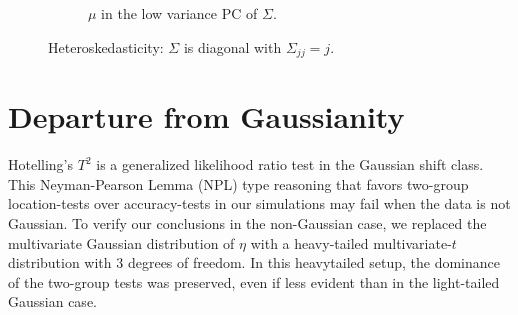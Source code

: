 \documentclass[oupdraft]{bio}
\begin{document}
\begin{figure}[h]
\begin{subfigure}[t]{0.45\columnwidth}
		\caption{$\mu$ in the low variance PC of $\Sigma$.}  
		\label{fig:heteroskedastic_12}	
	\end{subfigure}
	\caption{Heteroskedasticity: $\Sigma$ is diagonal with $\Sigma_{jj}=j$.}	
	\label{fig:heteroskedastic}	
\end{figure}



\section{Departure from Gaussianity}

Hotelling's $T^2$ is a generalized likelihood ratio test in the Gaussian shift class. 
This Neyman-Pearson Lemma (NPL) type reasoning that favors two-group location-tests over accuracy-tests in our simulations may fail when the data is not Gaussian.
To verify our conclusions in the non-Gaussian case, we replaced the multivariate Gaussian distribution of $\eta$ with a heavy-tailed multivariate-$t$ distribution with $3$ degrees of freedom. 
In this heavytailed setup, the dominance of the two-group tests was preserved, even if less evident than in the light-tailed Gaussian case.  
\end{document}
